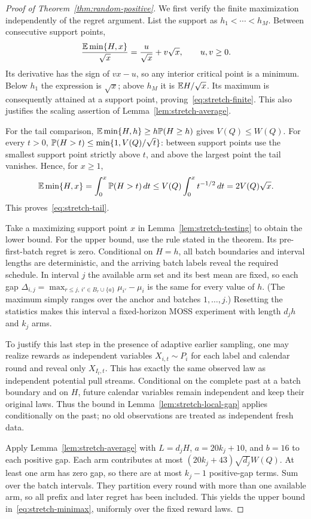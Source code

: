 \begin{proof}[Proof of Theorem~\ref{thm:random-positive}]
We first verify the finite maximization independently of the regret
argument. List the support as $h_1<\cdots<h_M$. Between consecutive
support points,
\[
 \frac{\mathbb E\min\{H,x\}}{\sqrt x}
       =\frac{u}{\sqrt x}+v\sqrt x,
 \qquad u,v\ge0.
\]
Its derivative has the sign of $vx-u$, so any interior critical
point is a minimum. Below $h_1$ the expression is $\sqrt x$; above
$h_M$ it is $\mathbb E H/\sqrt x$. Its maximum is consequently attained
at a support point, proving~\eqref{eq:stretch-finite}. This also
justifies the scaling assertion of Lemma~\ref{lem:stretch-average}.

For the tail comparison, $\mathbb E\min\{H,h\}\ge h\mathbb P(H\ge h)$ gives
$V(Q)\le W(Q)$. For every $t>0$,
$\mathbb P(H>t)\le\min\{1,V(Q)/\sqrt t\}$: between support points use
the smallest support point strictly above $t$, and above the largest
point the tail vanishes. Hence, for $x\ge1$,
\[
 \mathbb E\min\{H,x\}
 =\int_0^x\mathbb P(H>t)\,dt
 \le V(Q)\int_0^x t^{-1/2}\,dt
 =2V(Q)\sqrt x.
\]
This proves~\eqref{eq:stretch-tail}.

Take a maximizing support point $x$ in
Lemma~\ref{lem:stretch-testing} to obtain the lower bound.
For the upper bound, use the rule stated in the theorem. Its
pre-first-batch regret is zero. Conditional on $H=h$, all batch
boundaries and interval lengths are deterministic, and the arriving
batch labels reveal the required schedule. In interval $j$ the
available arm set and its best mean are fixed, so each gap
$\Delta_{i,j}=\max_{r\le j,\,i'\in B_r\cup\{a\}}\mu_{i'}-\mu_i$
is the same for every value of $h$. (The maximum simply ranges over
the anchor and batches $1,\ldots,j$.) Resetting the statistics makes
this interval a fixed-horizon MOSS experiment with length $d_jh$
and $k_j$ arms.

To justify this last step in the presence of adaptive earlier
sampling, one may realize rewards as independent variables
$X_{i,t}\sim P_i$ for each label and calendar round and reveal only
$X_{I_t,t}$. This has exactly the same observed law as independent
potential pull streams. Conditional on the complete past at a batch
boundary and on $H$, future calendar variables remain independent
and keep their original laws. Thus the bound in
Lemma~\ref{lem:stretch-local-gap} applies conditionally on the past;
no old observations are treated as independent fresh data.

Apply Lemma~\ref{lem:stretch-average} with $L=d_jH$,
$a=20k_j+10$, and $b=16$ to each positive gap. Each arm contributes
at most $(20k_j+43)\sqrt{d_j}W(Q)$. At least one arm has zero gap,
so there are at most $k_j-1$ positive-gap terms. Sum over the batch
intervals. They partition every round with more than one available
arm, so all prefix and later regret has been included. This yields
the upper bound in~\eqref{eq:stretch-minimax}, uniformly over the
fixed reward laws.
\end{proof}

